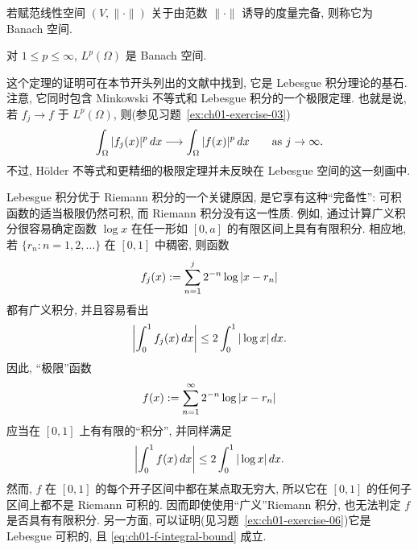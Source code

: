 \begin{Definition}
\label{def:ch01-banach-space}
若赋范线性空间 $(V,\|\cdot\|)$ 关于由范数 $\|\cdot\|$ 诱导的度量完备, 则称它为 Banach 空间.
\end{Definition}

\begin{Theorem}
\label{thm:ch01-lp-banach}
对 $1\leq p\leq\infty$, $L^p(\Omega)$ 是 Banach 空间.
\end{Theorem}

这个定理的证明可在本节开头列出的文献中找到, 它是 Lebesgue 积分理论的基石. 注意, 它同时包含 Minkowski 不等式和 Lebesgue 积分的一个极限定理. 也就是说, 若 $f_j\to f$ 于 $L^p(\Omega)$, 则(参见习题~\ref{ex:ch01-exercise-03})
\setcounter{equation}{8}
\begin{equation}
\MathBookFormulaID{formula-ch01-lp-integral-limit}
\int_\Omega|f_j(x)|^p\,dx\longrightarrow\int_\Omega|f(x)|^p\,dx
\qquad\text{as }j\to\infty.
\label{eq:ch01-lp-integral-limit}
\end{equation}
不过, Hölder 不等式和更精细的极限定理并未反映在 Lebesgue 空间的这一刻画中.

Lebesgue 积分优于 Riemann 积分的一个关键原因, 是它享有这种``完备性'': 可积函数的适当极限仍然可积, 而 Riemann 积分没有这一性质. 例如, 通过计算广义积分很容易确定函数 $\log x$ 在任一形如 $[0,a]$ 的有限区间上具有有限积分. 相应地, 若 $\{r_n:n=1,2,\ldots\}$ 在 $[0,1]$ 中稠密, 则函数
\begin{equation}
\MathBookFormulaID{formula-ch01-fj-log-series}
f_j(x):=\sum_{n=1}^j2^{-n}\log|x-r_n|
\label{eq:ch01-fj-log-series}
\end{equation}
都有广义积分, 并且容易看出
\begin{equation}
\MathBookFormulaID{formula-ch01-fj-integral-bound}
\left|\int_0^1f_j(x)\,dx\right|\leq2\int_0^1|\log x|\,dx.
\label{eq:ch01-fj-integral-bound}
\end{equation}
因此, ``极限''函数
\begin{equation}
\MathBookFormulaID{formula-ch01-f-log-series}
f(x):=\sum_{n=1}^\infty2^{-n}\log|x-r_n|
\label{eq:ch01-f-log-series}
\end{equation}
应当在 $[0,1]$ 上有有限的``积分'', 并同样满足
\begin{equation}
\MathBookFormulaID{formula-ch01-f-integral-bound}
\left|\int_0^1f(x)\,dx\right|\leq2\int_0^1|\log x|\,dx.
\label{eq:ch01-f-integral-bound}
\end{equation}
然而, $f$ 在 $[0,1]$ 的每个开子区间中都在某点取无穷大, 所以它在 $[0,1]$ 的任何子区间上都不是 Riemann 可积的. 因而即使使用``广义''Riemann 积分, 也无法判定 $f$ 是否具有有限积分. 另一方面, 可以证明(见习题~\ref{ex:ch01-exercise-06})它是 Lebesgue 可积的, 且 \eqref{eq:ch01-f-integral-bound} 成立.

